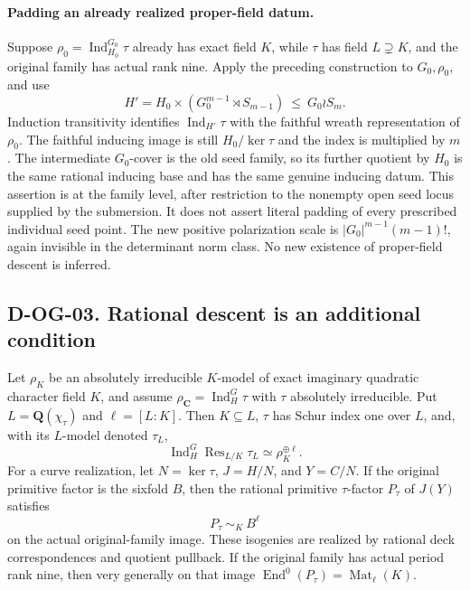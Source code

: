\paragraph{Padding an already realized proper-field datum.}
Suppose $\rho_0=\operatorname{Ind}_{H_0}^{G_0}\tau$ already
has exact field $K$, while $\tau$ has field $L\supsetneq K$,
and the original family has actual rank nine.
Apply the preceding construction to $G_0,\rho_0$, and use
\[
 H'=H_0\times(G_0^{m-1}\rtimes S_{m-1})
       \ \le\ G_0\wr S_m.
 \tag{OG.10}
\]
Induction transitivity identifies $\operatorname{Ind}_{H'}\tau$
with the faithful wreath representation of $\rho_0$.
The faithful inducing image is still $H_0/\ker\tau$ and the
index is multiplied by $m$.  The intermediate $G_0$-cover is
the old seed family, so its further quotient by $H_0$ is the
same rational inducing base and has the same genuine inducing
datum.  This assertion is at the family level, after restriction
to the nonempty open seed locus supplied by the submersion.
It does not assert literal padding of every prescribed individual
seed point.  The new positive polarization scale is
$|G_0|^{m-1}(m-1)!$, again invisible in the determinant norm class.
No new existence of proper-field descent is inferred.

\subsection*{D-OG-03. Rational descent is an additional condition}

\begin{proposition}[D-OG-03]
Let $\rho_K$ be an absolutely irreducible $K$-model of exact
imaginary quadratic character field $K$, and assume
$\rho_{\mathbf C}=\operatorname{Ind}_H^G\tau$ with $\tau$
absolutely irreducible.  Put $L=\mathbf Q(\chi_\tau)$ and
$\ell=[L:K]$.  Then $K\subseteq L$, $\tau$ has Schur index one
over $L$, and, with its $L$-model denoted $\tau_L$,
\[
 \operatorname{Ind}_H^G
       \operatorname{Res}_{L/K}\tau_L\simeq\rho_K^{\oplus\ell}.
 \tag{OG.11}
\]
For a curve realization, let $N=\ker\tau$, $J=H/N$, and $Y=C/N$.
If the original primitive factor is the sixfold $B$, then the
rational primitive $\tau$-factor $P_\tau$ of $J(Y)$ satisfies
\[
               P_\tau\ \sim_K\ B^\ell
 \tag{OG.12}
\]
on the actual original-family image.  These isogenies are realized
by rational deck correspondences and quotient pullback.
If the original family has actual period rank nine, then very
generally on that image
$\operatorname{End}^0(P_\tau)=\operatorname{Mat}_\ell(K)$.
\end{proposition}

